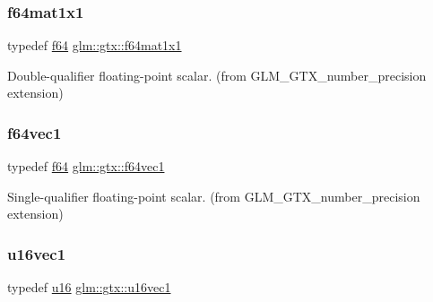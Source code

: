\subsubsection{\texorpdfstring{f64mat1x1}{f64mat1x1}}
{\footnotesize\ttfamily typedef \hyperlink{group__gtc__type__precision_ga2bba392e555124b36cde6abba349bab3}{f64} \hyperlink{group__gtx__number__precision_ga710a5952d78b22635c71c5fc2c0a3319}{glm\+::gtx\+::f64mat1x1}}



Double-\/qualifier floating-\/point scalar. (from G\+L\+M\+\_\+\+G\+T\+X\+\_\+number\+\_\+precision extension) 

\mbox{\label{group__gtx__number__precision_ga44336a26c958d66efdfb5a6c114c538e}} 
\subsubsection{\texorpdfstring{f64vec1}{f64vec1}}
{\footnotesize\ttfamily typedef \hyperlink{group__gtc__type__precision_ga2bba392e555124b36cde6abba349bab3}{f64} \hyperlink{group__gtx__number__precision_ga44336a26c958d66efdfb5a6c114c538e}{glm\+::gtx\+::f64vec1}}



Single-\/qualifier floating-\/point scalar. (from G\+L\+M\+\_\+\+G\+T\+X\+\_\+number\+\_\+precision extension) 

\mbox{\label{group__gtx__number__precision_ga807d7e5f24e981b1575bd40ca159781d}} 
\subsubsection{\texorpdfstring{u16vec1}{u16vec1}}
{\footnotesize\ttfamily typedef \hyperlink{group__gtc__type__precision_gae7a1571503f83d2264ddfa705a6b082a}{u16} \hyperlink{group__gtx__number__precision_ga807d7e5f24e981b1575bd40ca159781d}{glm\+::gtx\+::u16vec1}}



